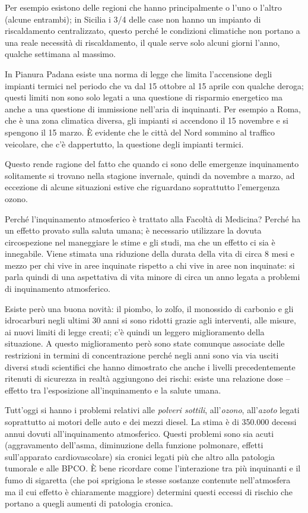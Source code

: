 Per esempio esistono delle regioni che hanno principalmente o l'uno o
l'altro (alcune entrambi); in Sicilia i 3/4 delle case non hanno un
impianto di riscaldamento centralizzato, questo perché le condizioni
climatiche non portano a una reale necessità di riscaldamento, il quale
serve solo alcuni giorni l'anno, qualche settimana al massimo.

In Pianura Padana esiste una norma di legge che limita l'accensione
degli impianti termici nel periodo che va dal 15 ottobre al 15 aprile
con qualche deroga; questi limiti non sono solo legati a una questione
di risparmio energetico ma anche a una questione di immissione nell'aria
di inquinanti. Per esempio a Roma, che è una zona climatica diversa, gli
impianti si accendono il 15 novembre e si spengono il 15 marzo. È
evidente che le città del Nord sommino al traffico veicolare, che c'è
dappertutto, la questione degli impianti termici.

Questo rende ragione del fatto che quando ci sono delle emergenze
inquinamento solitamente si trovano nella stagione invernale, quindi da
novembre a marzo, ad eccezione di alcune situazioni estive che
riguardano soprattutto l'emergenza ozono.

Perché l'inquinamento atmosferico è trattato alla Facoltà di Medicina?
Perché ha un effetto provato sulla saluta umana; è necessario utilizzare
la dovuta circospezione nel maneggiare le stime e gli studi, ma che un
effetto ci sia è innegabile. Viene stimata una riduzione della durata
della vita di circa 8 mesi e mezzo per chi vive in aree inquinate
rispetto a chi vive in aree non inquinate: si parla quindi di una
aspettativa di vita minore di circa un anno legata a problemi di
inquinamento atmosferico.

Esiste però una buona novità: il piombo, lo zolfo, il monossido di
carbonio e gli idrocarburi negli ultimi 30 anni si sono ridotti grazie
agli interventi, alle misure, ai nuovi limiti di legge creati; c'è
quindi un leggero miglioramento della situazione. A questo miglioramento
però sono state comunque associate delle restrizioni in termini di
concentrazione perché negli anni sono via via usciti diversi studi
scientifici che hanno dimostrato che anche i livelli precedentemente
ritenuti di sicurezza in realtà aggiungono dei rischi: esiste una
relazione dose -- effetto tra l'esposizione all'inquinamento e la salute
umana.

Tutt'oggi si hanno i problemi relativi alle \emph{polveri sottili},
all'\emph{ozono}, all'\emph{azoto} legati soprattutto ai motori delle
auto e dei mezzi diesel. La stima è di 350.000 decessi annui dovuti
all'inquinamento atmosferico. Questi problemi sono sia acuti
(aggravamento dell'asma, diminuzione della funzione polmonare, effetti
sull'apparato cardiovascolare) sia cronici legati più che altro alla
patologia tumorale e alle BPCO. È bene ricordare come l'interazione tra
più inquinanti e il fumo di sigaretta (che poi sprigiona le stesse
sostanze contenute nell'atmosfera ma il cui effetto è chiaramente
maggiore) determini questi eccessi di rischio che portano a quegli
aumenti di patologia cronica.

